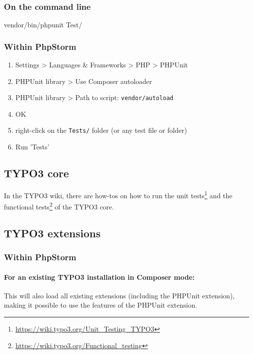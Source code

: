 \documentclass[a4paper,11pt,headsepline]{scrartcl}
\begin{document}
\subsubsection{On the command line}

\begin{bashcode}
vendor/bin/phpunit Test/
\end{bashcode}

\subsubsection{Within PhpStorm}
\begin{enumerate}
  \item Settings > Languages \& Frameworks > PHP > PHPUnit
  \item PHPUnit library > Use Composer autoloader
  \item PHPUnit library > Path to script: \texttt{vendor/autoload}
  \item OK
  \item right-click on the \texttt{Tests/} folder (or any test file or folder)
  \item Run 'Tests'
\end{enumerate}


\subsection{TYPO3 core}

In the TYPO3 wiki, there are how-tos on how to run the unit tests\footnote{\url{https://wiki.typo3.org/Unit_Testing_TYPO3}} and the functional tests\footnote{\url{https://wiki.typo3.org/Functional_testing}} of the TYPO3 core.


\subsection{TYPO3 extensions}

\subsubsection{Within PhpStorm}

\paragraph{For an existing TYPO3 installation in Composer mode:}

This will also load all existing extensions (including the PHPUnit extension), making it possible to use the features of the PHPUnit extension.
\end{document}
